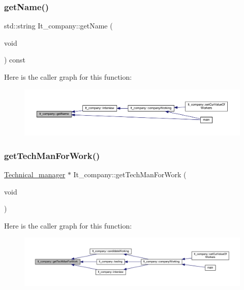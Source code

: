 \subsubsection{\texorpdfstring{get\+Name()}{getName()}}
{\footnotesize\ttfamily std\+::string It\+\_\+company\+::get\+Name (\begin{DoxyParamCaption}\item[{void}]{ }\end{DoxyParamCaption}) const\hspace{0.3cm}{\ttfamily [inline]}}

Here is the caller graph for this function\+:
\nopagebreak
\begin{figure}[H]
\begin{center}
\leavevmode
\includegraphics[width=350pt]{class_it__company_a83fff670c4a7271486f9632db1bf4d77_icgraph}
\end{center}
\end{figure}
\hypertarget{class_it__company_aa0b755bdb8d21b72bc42403b90b62898}{}\label{class_it__company_aa0b755bdb8d21b72bc42403b90b62898} 
\subsubsection{\texorpdfstring{get\+Tech\+Man\+For\+Work()}{getTechManForWork()}}
{\footnotesize\ttfamily \hyperlink{class_technical__manager}{Technical\+\_\+manager} $\ast$ It\+\_\+company\+::get\+Tech\+Man\+For\+Work (\begin{DoxyParamCaption}\item[{void}]{ }\end{DoxyParamCaption})\hspace{0.3cm}{\ttfamily [private]}}

Here is the caller graph for this function\+:
\nopagebreak
\begin{figure}[H]
\begin{center}
\leavevmode
\includegraphics[width=350pt]{class_it__company_aa0b755bdb8d21b72bc42403b90b62898_icgraph}
\end{center}
\end{figure}
\hypertarget{class_it__company_a292596bb863a09f2983cb955979a8bb9}{}\label{class_it__company_a292596bb863a09f2983cb955979a8bb9} 
